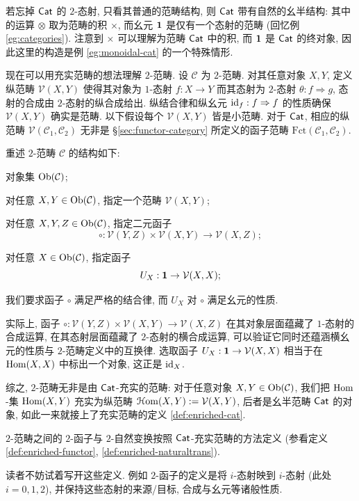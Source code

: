 若忘掉 $\mathsf{Cat}$ 的 $2$-态射, 只看其普通的范畴结构, 则 $\mathsf{Cat}$ 带有自然的幺半结构: 其中的运算 $\otimes$ 取为范畴的积 $\times$, 而幺元 $\mathbf{1}$ 是仅有一个态射的范畴 (回忆例 \ref{eg:categories}). 注意到 $\times$ 可以理解为范畴 $\mathsf{Cat}$ 中的积, 而 $\mathbf{1}$ 是 $\mathsf{Cat}$ 的终对象, 因此这里的构造是例 \ref{eg:monoidal-cat} 的一个特殊情形.

\begin{remark}
	现在可以用充实范畴的想法理解 $2$-范畴. 设 $\mathcal{C}$ 为 $2$-范畴. 对其任意对象 $X, Y$, 定义纵范畴 $\mathcal{V}(X, Y)$ 使得其对象为 $1$-态射 $f: X \to Y$ 而其态射为 $2$-态射 $\theta: f \Rightarrow g$, 态射的合成由 $2$-态射的纵合成给出. 纵结合律和纵幺元 $\mathrm{id}_f: f \Rightarrow f$ 的性质确保 $\mathcal{V}(X, Y)$ 确实是范畴. 以下假设每个 $\mathcal{V}(X, Y)$ 皆是小范畴. 对于 $\mathsf{Cat}$, 相应的纵范畴 $\mathcal{V}(\mathcal{C}_1, \mathcal{C}_2)$ 无非是 \S\ref{sec:functor-category} 所定义的函子范畴 $\text{Fct}(\mathcal{C}_1, \mathcal{C}_2)$.

	重述 $2$-范畴 $\mathcal{C}$ 的结构如下:
	\begin{compactitem}
		\item 对象集 $\operatorname{Ob}(\mathcal{C})$;
		\item 对任意 $X, Y \in \operatorname{Ob}(\mathcal{C})$, 指定一个范畴 $\mathcal{V}(X, Y)$;
		\item 对任意 $X, Y, Z \in \operatorname{Ob}(\mathcal{C})$, 指定二元函子
			\[ \circ: \mathcal{V}(Y, Z) \times \mathcal{V}(X, Y) \to \mathcal{V}(X, Z); \]
		\item 对任意 $X \in \operatorname{Ob}(\mathcal{C})$, 指定函子
			\[ U_X: \mathbf{1} \to \mathcal{V}(X, X); \]
		\item 我们要求函子 $\circ$ 满足严格的结合律, 而 $U_X$ 对 $\circ$ 满足幺元的性质.
	\end{compactitem}
	实际上, 函子 $\circ: \mathcal{V}(Y, Z) \times \mathcal{V}(X, Y) \to \mathcal{V}(X, Z)$ 在其对象层面蕴藏了 $1$-态射的合成运算, 在其态射层面蕴藏了 $2$-态射的横合成运算, 可以验证它同时还蕴涵横幺元的性质与 $2$-范畴定义中的互换律. 选取函子 $U_X: \mathbf{1} \to \mathcal{V}(X, X)$ 相当于在 $\operatorname{Hom}(X, X)$ 中标出一个对象, 这正是 $\mathrm{id}_X$.

	综之, $2$-范畴无非是由 $\mathsf{Cat}$-充实的范畴: 对于任意对象 $X, Y \in \operatorname{Ob}(\mathcal{C})$, 我们把 $\operatorname{Hom}$-集 $\operatorname{Hom}(X, Y)$ 充实为纵范畴 $\EuScript{H}\mathrm{om}(X, Y) := \mathcal{V}(X, Y)$, 后者是幺半范畴 $\mathsf{Cat}$ 的对象, 如此一来就接上了充实范畴的定义 \ref{def:enriched-cat}.
\end{remark}

\begin{definition}
	$2$-范畴之间的 $2$-函子与 $2$-自然变换按照 $\mathsf{Cat}$-充实范畴的方法定义 (参看定义 \ref{def:enriched-functor}, \ref{def:enriched-naturaltrans}).
\end{definition}
读者不妨试着写开这些定义. 例如 $2$-函子的定义是将 $i$-态射映到 $i$-态射 (此处 $i=0,1,2$), 并保持这些态射的来源/目标, 合成与幺元等诸般性质.

